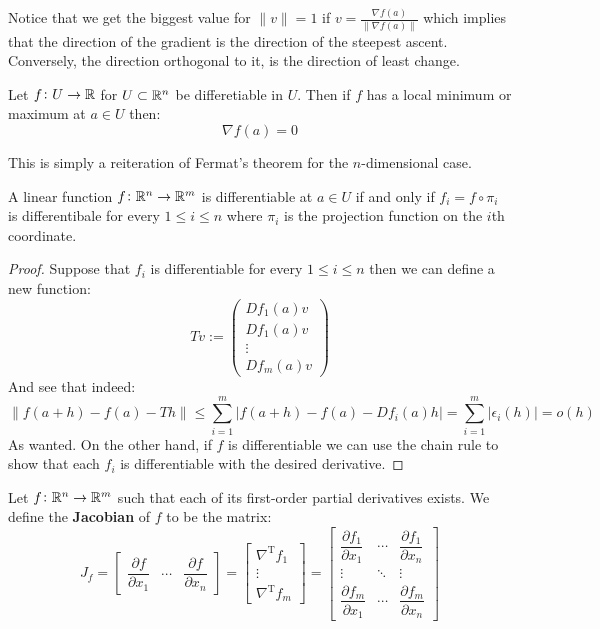 \documentclass[11pt,a4paper]{article}
\begin{document}
	\newpage
	\noindent Notice that we get the biggest value for $\|v\| = 1$ if
	$v = \frac{\nabla f(a)}{\|\nabla f(a)\|}$ which implies that the direction
	of the gradient is the direction of the steepest ascent. Conversely,
	the direction orthogonal to it, is the direction of least change.
	\begin{proposition}
		Let $f \colon U \to \mathbb{R}$ for $U \subset \mathbb{R}^n$ be differetiable in $U$.
		Then if $f$ has a local minimum or maximum at $a \in U$ then:
		\[
			\nabla f(a) = 0
		\]
	\end{proposition}
	\noindent
	This is simply a reiteration of Fermat's theorem for the $n$-dimensional
	case.
	\begin{proposition}
		A linear function $f \colon \mathbb{R}^n \to \mathbb{R}^m$ is differentiable at 
		$a \in U$ if and only if $f_i = f \circ \pi_i$ is differentibale 
		for every $1 \le i \le n$ where $\pi_i$ is the projection function 
		on the $i$th coordinate.
	\end{proposition}
	\begin{proof}
		Suppose that $f_i$ is differentiable for every $1 \le i \le n$ then
		we can define a new function:
		\[
			Tv := \begin{pmatrix}Df_1(a)v \\ Df_1(a)v \\ 
			\vdots \\ Df_m(a)v \end{pmatrix}
		\]
		And see that indeed:
		\[
			\|f(a + h) - f(a) - Th\| \le 
			\sum_{i=1}^{m}|f(a + h) - f(a) - Df_i(a)h| = 
			\sum_{i=1}^{m}|\epsilon_i(h)| = o(h)
		\]
		As wanted. On the other hand, if $f$ is differentiable we can use
		the chain rule to show that each $f_i$ is differentiable with the
		desired derivative.
	\end{proof}
	\begin{definition}
		Let $f \colon \mathbb{R}^n \to \mathbb{R}^m$ such that each of its first-order partial 
		derivatives exists. We define the \textbf{Jacobian} of $f$ to be the 
		matrix:
		\[
			{J_{f}} ={\begin{bmatrix}{\dfrac {\partial {f} }
			{\partial x_{1}}}&\cdots &{\dfrac {\partial {f} }{\partial 
			x_{n}}}\end{bmatrix}}={\begin{bmatrix}\nabla ^{\mathrm {T} }f_{1}\\
			\vdots \\\nabla ^{\mathrm {T} }f_{m}\end{bmatrix}}={\begin{bmatrix}
			{\dfrac {\partial f_{1}}{\partial x_{1}}}&\cdots &{\dfrac {\partial 
			f_{1}}{\partial x_{n}}}\\\vdots &\ddots &\vdots \\{\dfrac {\partial 
			f_{m}}{\partial x_{1}}}&\cdots &{\dfrac {\partial f_{m}}{\partial 
			x_{n}}}\end{bmatrix}}
		\]
	\end{definition}
\end{document}

